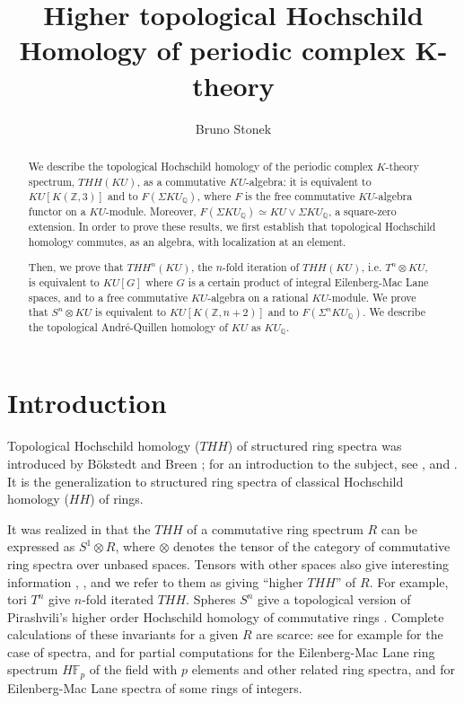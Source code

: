 \documentclass[a4paper,11pt]{amsart} %
\author{Bruno Stonek}
\theoremstyle{definition} \newtheorem{defn}[equation]{Definition}
\theoremstyle{remark} \newtheorem{notation}[equation]{Notation}
\theoremstyle{plain} \newtheorem{teo}[equation]{Theorem}
\theoremstyle{plain} \newtheorem{lema}[equation]{Lemma}
\theoremstyle{plain} \newtheorem{prop}[equation]{Proposition}
\theoremstyle{plain} \newtheorem{corolario}[equation]{Corollary}
\theoremstyle{remark} \newtheorem{obs}[equation]{Remark}
\theoremstyle{remark} \newtheorem{sideobs}[equation]{Side remark}
\theoremstyle{remark} \newtheorem{ejercicio}[equation]{Exercise}
\theoremstyle{definition} \newtheorem{notn}[equation]{Notation}
\theoremstyle{remark} \newtheorem{ej}[equation]{Example}
\theoremstyle{remark} \newtheorem{contraej}[equation]{Counterexample}
\theoremstyle{plain} \newtheorem{conj}[equation]{Conjecture}
\newcommand{\F}{\mathbb{F}}
\renewcommand{\1}{\ensuremath{\mathbbm{1}}}
\newcommand{\Q}{\mathbb{Q}}
\newcommand{\Z}{\mathbb{Z}}
\numberwithin{equation}{section}
\begin{document}
%
%
%


%
%
%
%

\title{Higher topological Hochschild Homology of periodic complex K-theory}

\def\C{\mathbb{C}}


%

%

\begin{abstract} We describe the topological Hochschild homology of the periodic complex $K$-theory spectrum, $THH(KU)$, as a commutative $KU$-algebra: it is equivalent to $KU[K(\Z,3)]$ and to $F(\Sigma KU_\Q)$, where $F$ is the free commutative $KU$-algebra functor on a $KU$-module. Moreover, $F(\Sigma KU_\Q)\simeq KU \vee \Sigma KU_\Q$, a square-zero extension. In order to prove these results, we first establish that topological Hochschild homology commutes, as an algebra, with localization at an element. 

Then, we prove that $THH^n(KU)$, the $n$-fold iteration of $THH(KU)$, i.e. $T^n\otimes KU$, is equivalent to $KU[G]$ where $G$ is a certain product of integral Eilenberg-Mac Lane spaces, and to a free commutative $KU$-algebra on a rational $KU$-module.
%
%
We prove that $S^n \otimes KU$ is equivalent to $KU[K(\Z,n+2)]$ and to $F(\Sigma^n KU_\Q)$. We describe the topological André-Quillen homology of $KU$ as $KU_\Q$.
\end{abstract}

\maketitle


\section{Introduction}

Topological Hochschild homology ($THH$) of structured ring spectra was introduced by Bökstedt \cite{bokstedt} and Breen \cite{breen}; for an introduction to the subject, see \cite[Chapter 4]{dgm}, \cite[Chapter IX]{ekmm} and \cite{shipley-thh}. It is the generalization to structured ring spectra of classical Hochschild homology ($HH$) of rings.

It was realized in \cite{mc-schw-vo} that the $THH$ of a commutative ring spectrum $R$ can be expressed as $S^1\otimes R$, where $\otimes$ denotes the tensor of the category of commutative ring spectra over unbased spaces. Tensors with other spaces also give interesting information \cite{bcd}, \cite{cdd}, and we refer to them as giving ``higher $THH$'' of $R$. For example, tori $T^n$ give $n$-fold iterated $THH$. %
Spheres $S^n$ give a topological version of Pirashvili's higher order Hochschild homology of commutative rings \cite{pirashvili}. Complete calculations of these invariants for a given $R$ are scarce: see for example \cite{schlichtkrull-higher} for the case of  spectra, \cite{veen} and \cite{blprz} for partial computations for the Eilenberg-Mac Lane ring spectrum $H\F_p$ of the field with $p$ elements  and other related ring spectra, and \cite{dlr} for Eilenberg-Mac Lane spectra of some rings of integers.
\end{document}
